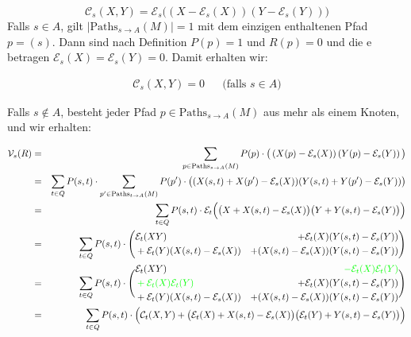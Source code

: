 \documentclass[a4paper]{article}
\theoremstyle{nonumberplain}
\begin{document}
{\begin{equation}
\mathcal{C}_{s}(X,Y) = \mathcal{E}_{s}\big(\left(X - \mathcal{E}_{s} (X)\right)\left(Y - \mathcal{E}_{s} (Y)\right)\big)
\end{equation}
Falls $s \in A$, gilt $|\mathrm{Paths}_{s \rightarrow A}(M)| = 1$ mit dem einzigen enthaltenen Pfad $p = (s)$. Dann sind nach Definition $P(p) = 1$ und $R(p) = 0$ und die \expect{}e betragen $\mathcal{E}_{s}(X) = \mathcal{E}_{s}(Y) = 0$. Damit erhalten wir:

\begin{align}
\mathcal{C}_{s}(X,Y) = 0 && \text{(falls $s \in A$)}\label{cov_trivial}
\end{align}

Falls $s \notin A$, besteht jeder Pfad $p \in \mathrm{Paths}_{s \rightarrow A}(M)$ aus mehr als einem Knoten, und wir erhalten:

\begin{align}
\mathcal{V}_{s}(R) & = & \sum_{p \in \mathrm{Paths}_{s \rightarrow A}(M)}{P(p) \cdot \big(\left(X(p) - \mathcal{E}_{s} (X)\right)\left(Y(p) - \mathcal{E}_{s} (Y)\right)\big)} \\
& = & \sum_{t \in Q}{ P(s,t) \cdot \sum_{p' \in \mathrm{Paths}_{t \rightarrow A}(M)}{ P(p') \cdot \big((X(s,t) + X(p') - \mathcal{E}_{s}(X))(Y(s,t) + Y(p') - \mathcal{E}_{s}(Y))\big)} } \\
& = & \sum_{t \in Q}{ P(s,t) \cdot \mathcal{E}_{t}\Big(\big(X + X(s,t) - \mathcal{E}_{s}(X)\big)\big(Y + Y(s,t) - \mathcal{E}_{s}(Y)\big)\Big) }\\
& = & \sum_{t \in Q}P(s,t) \cdot \Bigg(\begin{aligned}
&\mathcal{E}_{t}(XY)
&+ \mathcal{E}_{t}(X)(Y(s,t) - \mathcal{E}_{s}(Y))\\
&+ \mathcal{E}_{t}(Y)(X(s,t) - \mathcal{E}_{s}(X))
&+ (X(s,t) - \mathcal{E}_{s}(X))(Y(s,t) - \mathcal{E}_{s}(Y))
\end{aligned} \Bigg)\\
& = & \sum_{t \in Q}P(s,t) \cdot \Bigg(\begin{aligned}
&\mathcal{E}_{t}(XY)
&\color{green}- \mathcal{E}_{t}(X)\mathcal{E}_{t}(Y)\\
&\color{green}+ \mathcal{E}_{t}(X)\mathcal{E}_{t}(Y)
&+ \mathcal{E}_{t}(X)(Y(s,t) - \mathcal{E}_{s}(Y))\\
&+ \mathcal{E}_{t}(Y)(X(s,t) - \mathcal{E}_{s}(X))
&+ (X(s,t) - \mathcal{E}_{s}(X))(Y(s,t) - \mathcal{E}_{s}(Y))
\end{aligned} \Bigg)\\
& = & \sum_{t \in Q}P(s,t) \cdot \Big( \mathcal{C}_{t}(X,Y) + \big(\mathcal{E}_{t}(X) + X(s,t) - \mathcal{E}_{s}(X)\big)\big(\mathcal{E}_{t}(Y) + Y(s,t) - \mathcal{E}_{s}(Y)\big)\Big)\label{cov_recursive}
\end{align}

}
\end{document}

